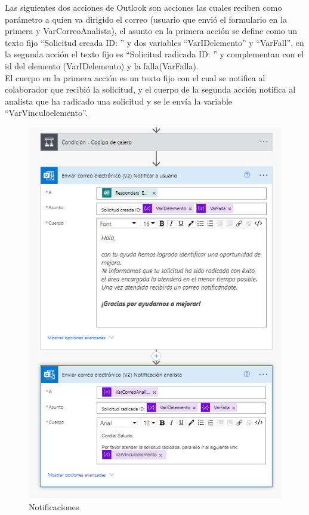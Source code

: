 Las siguientes dos acciones de Outlook son acciones las cuales reciben como parámetro a quien va dirigido el correo (usuario que envió el formulario en la primera y VarCorreoAnalista), el asunto en la primera acción se define como un texto fijo ``Solicitud creada ID: '' y dos variables ``VarIDelemento'' y ``VarFall'', en la segunda acción el texto fijo es ``Solicitud radicada ID: '' y complementan con el id del elemento (VarIDelemento) y la falla(VarFalla).
\\

El cuerpo en la primera acción es un texto fijo con el cual se notifica al colaborador que recibió la solicitud, y el cuerpo de la segunda acción notifica al analista que ha radicado una solicitud y se le envía la variable ``VarVinculoelemento''.

\begin{figure}[H]
	\centering
	\includegraphics[scale=0.5]{Capitulo3/imagenes/flujo15.png}
	\caption{Notificaciones}
	\label{not}
\end{figure}


